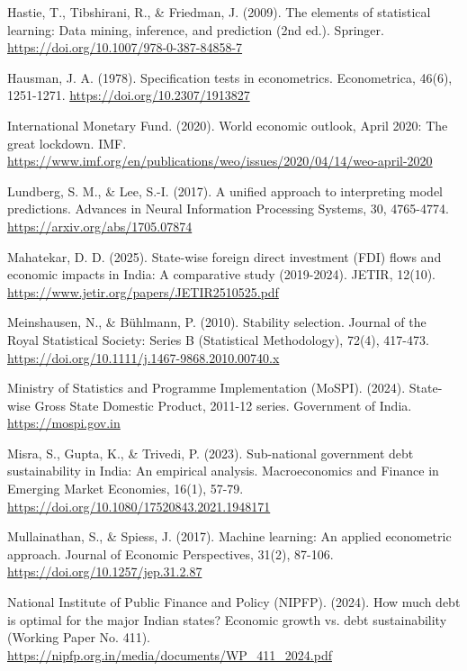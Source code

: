 \documentclass[12pt,a4paper]{article}
\begin{document}
\hangindent=0.5in
Hastie, T., Tibshirani, R., \& Friedman, J. (2009). The elements of statistical learning: Data mining, inference, and prediction (2nd ed.). Springer. \url{https://doi.org/10.1007/978-0-387-84858-7}

\hangindent=0.5in
Hausman, J. A. (1978). Specification tests in econometrics. Econometrica, 46(6), 1251-1271. \url{https://doi.org/10.2307/1913827}

\hangindent=0.5in
International Monetary Fund. (2020). World economic outlook, April 2020: The great lockdown. IMF. \url{https://www.imf.org/en/publications/weo/issues/2020/04/14/weo-april-2020}

\hangindent=0.5in
Lundberg, S. M., \& Lee, S.-I. (2017). A unified approach to interpreting model predictions. Advances in Neural Information Processing Systems, 30, 4765-4774. \url{https://arxiv.org/abs/1705.07874}

\hangindent=0.5in
Mahatekar, D. D. (2025). State-wise foreign direct investment (FDI) flows and economic impacts in India: A comparative study (2019-2024). JETIR, 12(10). \url{https://www.jetir.org/papers/JETIR2510525.pdf}

\hangindent=0.5in
Meinshausen, N., \& Bühlmann, P. (2010). Stability selection. Journal of the Royal Statistical Society: Series B (Statistical Methodology), 72(4), 417-473. \url{https://doi.org/10.1111/j.1467-9868.2010.00740.x}

\hangindent=0.5in
Ministry of Statistics and Programme Implementation (MoSPI). (2024). State-wise Gross State Domestic Product, 2011-12 series. Government of India. \url{https://mospi.gov.in}

\hangindent=0.5in
Misra, S., Gupta, K., \& Trivedi, P. (2023). Sub-national government debt sustainability in India: An empirical analysis. Macroeconomics and Finance in Emerging Market Economies, 16(1), 57-79. \url{https://doi.org/10.1080/17520843.2021.1948171}

\hangindent=0.5in
Mullainathan, S., \& Spiess, J. (2017). Machine learning: An applied econometric approach. Journal of Economic Perspectives, 31(2), 87-106. \url{https://doi.org/10.1257/jep.31.2.87}

\hangindent=0.5in
National Institute of Public Finance and Policy (NIPFP). (2024). How much debt is optimal for the major Indian states? Economic growth vs. debt sustainability (Working Paper No. 411). \url{https://nipfp.org.in/media/documents/WP_411_2024.pdf}
\end{document}
